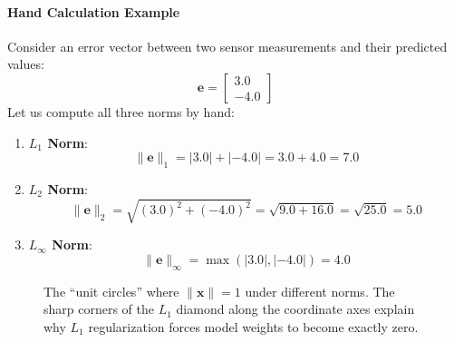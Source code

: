 \paragraph{Hand Calculation Example}
Consider an error vector between two sensor measurements and their predicted values:
\begin{equation*}
\mathbf{e} = \begin{bmatrix} 3.0 \\ -4.0 \end{bmatrix}
\end{equation*}
Let us compute all three norms by hand:
\begin{enumerate}
    \item \textbf{$L_1$ Norm}:
    \begin{equation*}
    \|\mathbf{e}\|_1 = |3.0| + |-4.0| = 3.0 + 4.0 = 7.0
    \end{equation*}
    \item \textbf{$L_2$ Norm}:
    \begin{equation*}
    \|\mathbf{e}\|_2 = \sqrt{(3.0)^2 + (-4.0)^2} = \sqrt{9.0 + 16.0} = \sqrt{25.0} = 5.0
    \end{equation*}
    \item \textbf{$L_\infty$ Norm}:
    \begin{equation*}
    \|\mathbf{e}\|_\infty = \max(|3.0|, |-4.0|) = 4.0
    \end{equation*}
\end{enumerate}

\begin{figure}[htbp]
\centering
{}
\caption{The ``unit circles'' where $\|\mathbf{x}\| = 1$ under different norms. The sharp corners of the $L_1$ diamond along the coordinate axes explain why $L_1$ regularization forces model weights to become exactly zero.}\label{fig:norm_shapes}
\end{figure}

